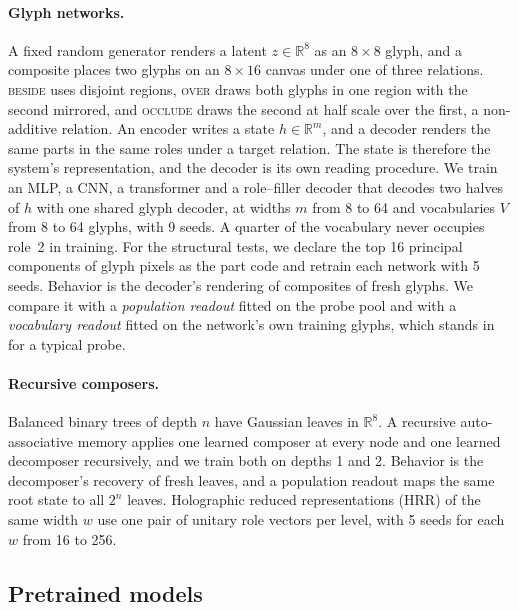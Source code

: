 \documentclass[10pt]{article}
\theoremstyle{plain}
\theoremstyle{remark}
\newcommand{\R}{\mathbb{R}}
\begin{document}
\paragraph{Glyph networks.} A fixed random generator renders a latent $z \in \R^{8}$ as an $8 \times 8$ glyph, and a composite places two glyphs on an $8 \times 16$ canvas under one of three relations. \textsc{beside} uses disjoint regions, \textsc{over} draws both glyphs in one region with the second mirrored, and \textsc{occlude} draws the second at half scale over the first, a non-additive relation. An encoder writes a state $h \in \R^m$, and a decoder renders the same parts in the same roles under a target relation. The state is therefore the system's representation, and the decoder is its own reading procedure. We train an MLP, a CNN, a transformer and a role--filler decoder that decodes two halves of $h$ with one shared glyph decoder, at widths $m$ from 8 to 64 and vocabularies $V$ from 8 to 64 glyphs, with 9 seeds. A quarter of the vocabulary never occupies role~2 in training. For the structural tests, we declare the top 16 principal components of glyph pixels as the part code and retrain each network with 5 seeds. Behavior is the decoder's rendering of composites of fresh glyphs. We compare it with a \emph{population readout} fitted on the probe pool and with a \emph{vocabulary readout} fitted on the network's own training glyphs, which stands in for a typical probe.

\paragraph{Recursive composers.} Balanced binary trees of depth $n$ have Gaussian leaves in $\R^8$. A recursive auto-associative memory \citep{pollack1990} applies one learned composer at every node and one learned decomposer recursively, and we train both on depths 1 and 2. Behavior is the decomposer's recovery of fresh leaves, and a population readout maps the same root state to all $2^n$ leaves. Holographic reduced representations (HRR) of the same width $w$ use one pair of unitary role vectors per level, with 5 seeds for each $w$ from 16 to 256.

\subsection{Pretrained models}
\label{sec:design_pretrained}
\end{document}
